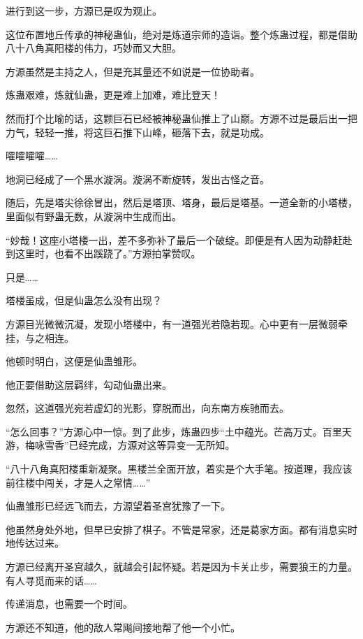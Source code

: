 
\begin{this_body}



进行到这一步，方源已是叹为观止。

这位布置地丘传承的神秘蛊仙，绝对是炼道宗师的造诣。整个炼蛊过程，都是借助八十八角真阳楼的伟力，巧妙而又大胆。

方源虽然是主持之人，但是充其量还不如说是一位协助者。

炼蛊艰难，炼就仙蛊，更是难上加难，难比登天！

然而打个比喻的话，这颗巨石已经被神秘蛊仙推上了山巅。方源不过是最后出一把力气，轻轻一推，将这巨石推下山峰，砸落下去，就是功成。

嚯嚯嚯嚯……

地洞已经成了一个黑水漩涡。漩涡不断旋转，发出古怪之音。

随后，先是塔尖徐徐冒出，然后是塔顶、塔身，最后是塔基。一道全新的小塔楼，里面似有野蛊无数，从漩涡中生成而出。

“妙哉！这座小塔楼一出，差不多弥补了最后一个破绽。即便是有人因为动静赶赴到这里时，也看不出蹊跷了。”方源拍掌赞叹。

只是……

塔楼虽成，但是仙蛊怎么没有出现？

方源目光微微沉凝，发现小塔楼中，有一道强光若隐若现。心中更有一层微弱牵挂，与之相连。

他顿时明白，这便是仙蛊雏形。

他正要借助这层羁绊，勾动仙蛊出来。

忽然，这道强光宛若虚幻的光影，穿脱而出，向东南方疾驰而去。

“怎么回事？”方源心中一惊。到了此步，炼蛊四步“土中蕴光。芒高万丈。百里天游，梅咏雪香”已经完成，方源对这等异变一无所知。

“八十八角真阳楼重新凝聚。黑楼兰全面开放，着实是个大手笔。按道理，我应该前往楼中闯关，才是人之常情……”

仙蛊雏形已经远飞而去，方源望着圣宫犹豫了一下。

他虽然身处外地，但早已安排了棋子。不管是常家，还是葛家方面。都有消息实时地传达过来。

方源已经离开圣宫越久，就越会引起怀疑。若是因为卡关止步，需要狼王的力量。有人寻觅而来的话……

传递消息，也需要一个时间。

方源还不知道，他的敌人常飚间接地帮了他一个小忙。


\end{this_body}
